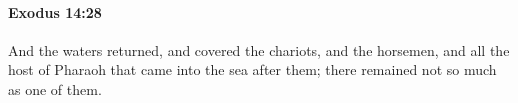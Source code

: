 
		\paragraph{Exodus 14:28} %
			\label{EXODUS-14-28}

			And the waters returned, and covered the chariots, and the horsemen, and all the host of Pharaoh that came into the sea after them; there remained not so much as one of them.



